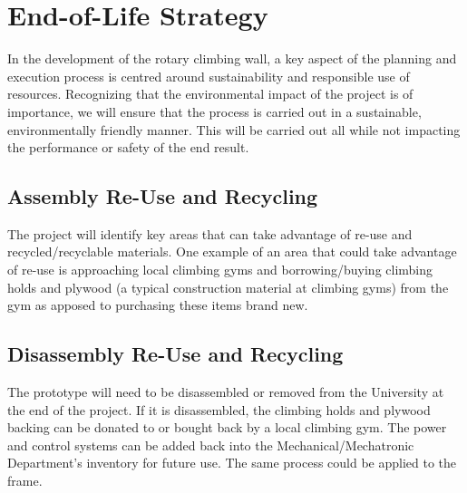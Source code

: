 \chapter{End-of-Life Strategy}

In the development of the rotary climbing wall, a key aspect of the planning and execution process is centred around sustainability and responsible use of resources. Recognizing that the environmental impact of the project is of importance, we will ensure that the process is carried out in a sustainable, environmentally friendly manner. This will be carried out all while not impacting the performance or safety of the end result.

\section*{Assembly Re-Use and Recycling}
The project will identify key areas that can take advantage of re-use and recycled/recyclable materials. One example of an area that could take advantage of re-use is approaching local climbing gyms and borrowing/buying climbing holds and plywood (a typical construction material at climbing gyms) from the gym as apposed to purchasing these items brand new. 

\section*{Disassembly Re-Use and Recycling}
The prototype will need to be disassembled or removed from the University at the end of the project. If it is disassembled, the climbing holds and plywood backing can be donated to or bought back by a local climbing gym. The power and control systems can be added back into the Mechanical/Mechatronic Department's inventory for future use. The same process could be applied to the frame.

